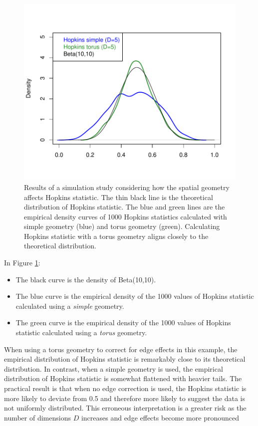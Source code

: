 \begin{figure}

{\centering \includegraphics[width=0.9\linewidth]{RJ-2022-055_files/figure-latex/torus-1} 

}

\caption{Results of a simulation study considering how the spatial geometry affects Hopkins statistic. The thin black line is the theoretical distribution of Hopkins statistic. The blue and green lines are the empirical density curves of 1000 Hopkins statistics calculated with simple geometry (blue) and torus geometry (green). Calculating Hopkins statistic with a torus geometry aligns closely to the theoretical distribution.}\label{fig:torus}
\end{figure}

In Figure \ref{fig:torus}:

\begin{itemize}
\tightlist
\item
  The black curve is the density of Beta(10,10).
\item
  The blue curve is the empirical density of the 1000 values of Hopkins statistic calculated using a \emph{simple} geometry.
\item
  The green curve is the empirical density of the 1000 values of Hopkins statistic calculated using a \emph{torus} geometry.
\end{itemize}

When using a torus geometry to correct for edge effects in this example, the empirical distribution of Hopkins statistic is remarkably close to its theoretical distribution. In contrast, when a simple geometry is used, the empirical distribution of Hopkins statistic is somewhat flattened with heavier tails. The practical result is that when no edge correction is used, the Hopkins statistic is more likely to deviate from 0.5 and therefore more likely to suggest the data is not uniformly distributed. This erroneous interpretation is a greater risk as the number of dimensions \(D\) increases and edge effects become more pronounced

